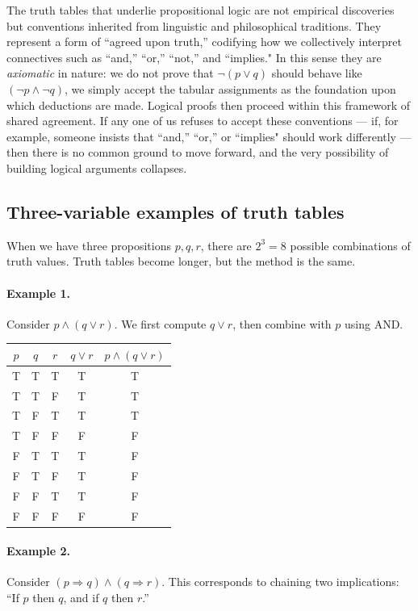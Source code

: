 The truth tables that underlie propositional logic are not empirical discoveries but conventions inherited from linguistic and philosophical traditions. They represent a form of “agreed upon truth,” codifying how we collectively interpret connectives such as “and,” “or,” “not,” and ``implies." In this sense they are {\em axiomatic} in nature: we do not prove that $\lnot (p \lor q)$ should behave like $(\lnot p \land \lnot q)$, we simply accept the tabular assignments as the foundation upon which deductions are made. Logical proofs then proceed within this framework of shared agreement. If any one of us refuses to accept these conventions — if, for example, someone insists that “and,” “or,” or ``implies" should work differently — then there is no common ground to move forward, and the very possibility of building logical arguments collapses.

\subsection{Three-variable examples of truth tables}
When we have three propositions $p,q,r$, there are $2^3 = 8$ possible combinations 
of truth values. Truth tables become longer, but the method is the same.

\paragraph{Example 1.} 
Consider $p \land (q \lor r)$.  
We first compute $q \lor r$, then combine with $p$ using AND.

\begin{center}
\begin{tabular}{|c|c|c||c|c|}
\hline
$p$ & $q$ & $r$ & $q \lor r$ & $p \land (q \lor r)$ \\
\hline
T & T & T & T & T \\
T & T & F & T & T \\
T & F & T & T & T \\
T & F & F & F & F \\
F & T & T & T & F \\
F & T & F & T & F \\
F & F & T & T & F \\
F & F & F & F & F \\
\hline
\end{tabular}
\end{center}



\paragraph{Example 2.}
Consider $(p \Rightarrow q) \land (q \Rightarrow r)$.  
This corresponds to chaining two implications: 
``If $p$ then $q$, and if $q$ then $r$.''

